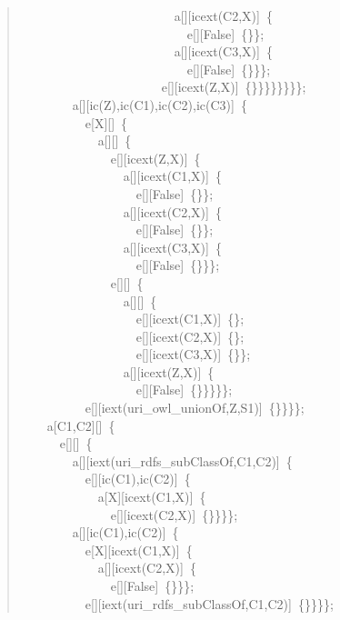 \begin{quote}
{~~~~~~~~~~~~~~~~~~~~~~~~a[][icext(C2,X)]~\{\\
~~~~~~~~~~~~~~~~~~~~~~~~~~e[][False]~\{\}\};\\
~~~~~~~~~~~~~~~~~~~~~~~~a[][icext(C3,X)]~\{\\
~~~~~~~~~~~~~~~~~~~~~~~~~~e[][False]~\{\}\}\};\\
~~~~~~~~~~~~~~~~~~~~~~e[][icext(Z,X)]~\{\}\}\}\}\}\}\}\};\\
~~~~~~~~a[][ic(Z),ic(C1),ic(C2),ic(C3)]~\{\\
~~~~~~~~~~e[X][]~\{\\
~~~~~~~~~~~~a[][]~\{\\
~~~~~~~~~~~~~~e[][icext(Z,X)]~\{\\
~~~~~~~~~~~~~~~~a[][icext(C1,X)]~\{\\
~~~~~~~~~~~~~~~~~~e[][False]~\{\}\};\\
~~~~~~~~~~~~~~~~a[][icext(C2,X)]~\{\\
~~~~~~~~~~~~~~~~~~e[][False]~\{\}\};\\
~~~~~~~~~~~~~~~~a[][icext(C3,X)]~\{\\
~~~~~~~~~~~~~~~~~~e[][False]~\{\}\}\};\\
~~~~~~~~~~~~~~e[][]~\{\\
~~~~~~~~~~~~~~~~a[][]~\{\\
~~~~~~~~~~~~~~~~~~e[][icext(C1,X)]~\{\};\\
~~~~~~~~~~~~~~~~~~e[][icext(C2,X)]~\{\};\\
~~~~~~~~~~~~~~~~~~e[][icext(C3,X)]~\{\}\};\\
~~~~~~~~~~~~~~~~a[][icext(Z,X)]~\{\\
~~~~~~~~~~~~~~~~~~e[][False]~\{\}\}\}\}\};\\
~~~~~~~~~~e[][iext(uri\_owl\_unionOf,Z,S1)]~\{\}\}\}\};\\
~~~~a[C1,C2][]~\{\\
~~~~~~e[][]~\{\\
~~~~~~~~a[][iext(uri\_rdfs\_subClassOf,C1,C2)]~\{\\
~~~~~~~~~~e[][ic(C1),ic(C2)]~\{\\
~~~~~~~~~~~~a[X][icext(C1,X)]~\{\\
~~~~~~~~~~~~~~e[][icext(C2,X)]~\{\}\}\}\};\\
~~~~~~~~a[][ic(C1),ic(C2)]~\{\\
~~~~~~~~~~e[X][icext(C1,X)]~\{\\
~~~~~~~~~~~~a[][icext(C2,X)]~\{\\
~~~~~~~~~~~~~~e[][False]~\{\}\}\};\\
~~~~~~~~~~e[][iext(uri\_rdfs\_subClassOf,C1,C2)]~\{\}\}\}\};\\
}
\end{quote}
